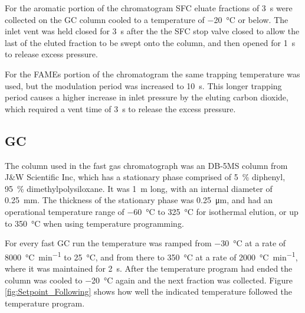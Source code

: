 For the aromatic portion of the chromatogram SFC eluate fractions of
\SI{3}{\second} were collected on the GC column cooled to a temperature of
\SI{-20}{\celsius} or below. The inlet vent was held closed for \SI{3}{\second}
after the the SFC stop valve closed to allow the last of the eluted fraction to
be swept onto the column, and then opened for \SI{1}{\second} to release excess
pressure.

For the FAMEs portion of the chromatogram the same trapping temperature was
used, but the modulation period was increased to \SI{10}{\second}. This longer
trapping period causes a higher increase in inlet pressure by the eluting carbon
dioxide, which required a vent time of \SI{3}{\second} to release the excess
pressure.

\subsection{GC}

The column used in the fast gas chromatograph was an DB-5MS column from J\&W
Scientific Inc, which has a stationary phase comprised of \SI{5}{\percent}
diphenyl, \SI{95}{\percent} di\-meth\-yl\-poly\-si\-lox\-ane. It was \SI{1}{\metre} long,
with an internal diameter of \SI{0.25}{\milli\metre}. The thickness of the
stationary phase was \SI{0.25}{\micro\metre}, and had an operational temperature
range of \SI{-60}{\celsius} to \SI{325}{\celsius} for isothermal elution, or up
to \SI{350}{\celsius} when using temperature programming.

For every fast GC run the temperature was ramped from \SI{-30}{\celsius} at a
rate of \SI{8000}{\celsius\per\minute} to \SI{25}{\celsius}, and from there to
\SI{350}{\celsius} at a rate of \SI{2000}{\celsius\per\minute}, where it was
maintained for \SI{2}{s}. After the temperature program had ended the column was
cooled to \SI{-20}{\celsius} again and the next fraction was collected. Figure
\ref{fig:Setpoint_Following} shows how well the indicated temperature followed
the temperature program.

